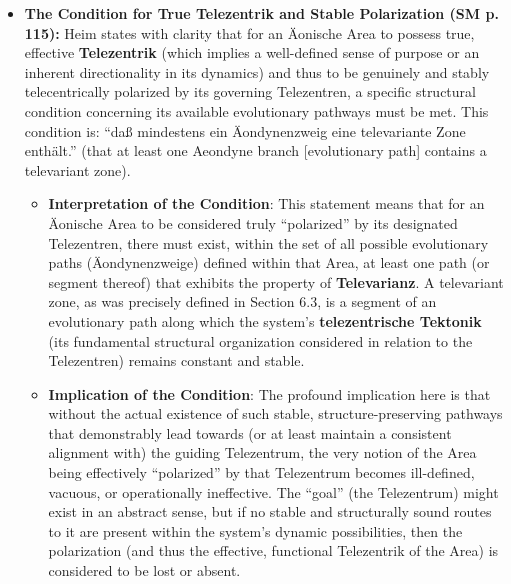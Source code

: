 \documentclass[12pt]{article}
\newcommand{\q}[1]{\enquote{#1}}
\begin{document}
\begin{itemize}
    \item \textbf{The Condition for True Telezentrik and Stable Polarization (SM p. 115):}
    Heim states with clarity that for an Äonische Area to possess true, effective \textbf{Telezentrik} (which implies a well-defined sense of purpose or an inherent directionality in its dynamics) and thus to be genuinely and stably telecentrically polarized by its governing Telezentren, a specific structural condition concerning its available evolutionary pathways must be met. This condition is: \q{daß mindestens ein Äondynenzweig eine televariante Zone enthält.} (that at least one Aeondyne branch [evolutionary path] contains a televariant zone).
    \begin{itemize}
        \item \textbf{Interpretation of the Condition}: This statement means that for an Äonische Area to be considered truly \q{polarized} by its designated Telezentren, there must exist, within the set of all possible evolutionary paths (Äondynenzweige) defined within that Area, at least one path (or segment thereof) that exhibits the property of \textbf{Televarianz}. A televariant zone, as was precisely defined in Section 6.3, is a segment of an evolutionary path along which the system's \textbf{telezentrische Tektonik} (its fundamental structural organization considered in relation to the Telezentren) remains constant and stable.
        \item \textbf{Implication of the Condition}: The profound implication here is that without the actual existence of such stable, structure-preserving pathways that demonstrably lead towards (or at least maintain a consistent alignment with) the guiding Telezentrum, the very notion of the Area being effectively \q{polarized} by that Telezentrum becomes ill-defined, vacuous, or operationally ineffective. The \q{goal} (the Telezentrum) might exist in an abstract sense, but if no stable and structurally sound routes to it are present within the system's dynamic possibilities, then the polarization (and thus the effective, functional Telezentrik of the Area) is considered to be lost or absent.
    \end{itemize}


\end{itemize}
\end{document}

